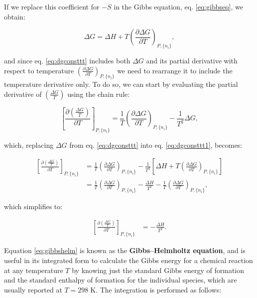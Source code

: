 \documentclass[
  9pt,
]{extbook}
\theoremstyle{definition}
\theoremstyle{definition}
\theoremstyle{definition}
\theoremstyle{definition}
\theoremstyle{remark}
\begin{document}
If we replace this coefficient for \(-S\) in the Gibbs equation, eq. \eqref{eq:gibbseq}, we obtain:

\begin{equation}
\Delta G = \Delta H + T \left(\frac{\partial \Delta G}{\partial T} \right)_{P,\{n_i\}},
\label{eq:dgconsttt}
\end{equation}

and since eq. \eqref{eq:dgconsttt} includes both \(\Delta G\) and its partial derivative with respect to temperature \(\left(\frac{\partial \Delta G}{\partial T} \right)_{P,\{n_i\}}\) we need to rearrange it to include the temperature derivative only. To do so, we can start by evaluating the partial derivative of \(\left( \frac{\Delta G}{T} \right)\) using the chain rule:

\begin{equation}
\left[ \frac{\partial\left( \frac{\Delta G}{T} \right)}{\partial T} \right]_{P,\{n_i\}} = \frac{1}{T} \left(\frac{\partial \Delta G}{\partial T}  \right)_{P,\{n_i\}} - \frac{1}{T^2}\Delta G,
\label{eq:dgconsttt1}
\end{equation}

which, replacing \(\Delta G\) from eq. \eqref{eq:dgconsttt} into eq. \eqref{eq:dgconsttt1}, becomes:

\begin{equation}
\begin{aligned}
\left[ \frac{\partial\left( \frac{\Delta G}{T} \right)}{\partial T} \right]_{P,\{n_i\}} &= \frac{1}{T} \left(\frac{\partial \Delta G}{\partial T}  \right)_{P,\{n_i\}} - \frac{1}{T^2} \left[ \Delta H + T \left(\frac{\partial \Delta G}{\partial T} \right)_{P,\{n_i\}} \right] \\
&= \frac{1}{T} \left(\frac{\partial \Delta G}{\partial T}  \right)_{P,\{n_i\}}- \frac{\Delta H}{T^2}-\frac{1}{T} \left(\frac{\partial \Delta G}{\partial T}  \right)_{P,\{n_i\}},
\end{aligned}
\label{eq:dgconsttt2}
\end{equation}

which simplifies to:

\begin{equation}
\begin{aligned}
\left[ \frac{\partial\left( \frac{\Delta G}{T} \right)}{\partial T} \right]_{P,\{n_i\}} &= - \frac{\Delta H}{T^2}.
\end{aligned}
\label{eq:gibbshelm}
\end{equation}

Equation \eqref{eq:gibbshelm} is known as the \textbf{Gibbs--Helmholtz equation}, and is useful in its integrated form to calculate the Gibbs energy for a chemical reaction at any temperature \(T\) by knowing just the standard Gibbs energy of formation and the standard enthalpy of formation for the individual species, which are usually reported at \(T=298\;\text{K}\). The integration is performed as follows:
\end{document}
